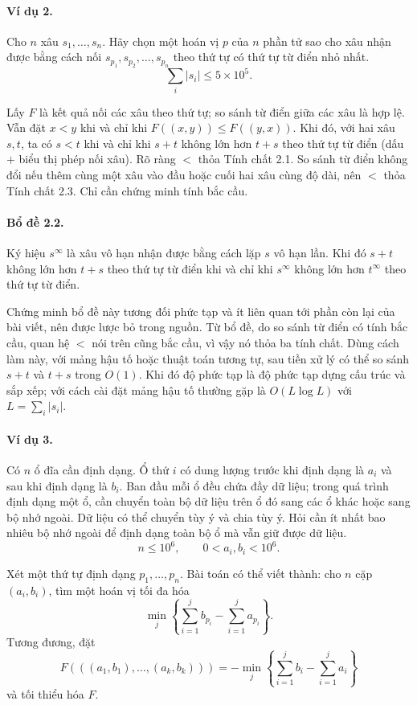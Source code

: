 \documentclass[11pt]{article}
\begin{document}
\paragraph{Ví dụ 2.}
Cho $n$ xâu $s_1,\ldots,s_n$. Hãy chọn một hoán vị $p$ của $n$ phần tử sao cho
xâu nhận được bằng cách nối $s_{p_1},s_{p_2},\ldots,s_{p_n}$ theo thứ tự có thứ
tự từ điển nhỏ nhất.
\[
  \sum_i |s_i|\le 5\times 10^5.
\]

Lấy $F$ là kết quả nối các xâu theo thứ tự; so sánh từ điển giữa các xâu là hợp
lệ. Vẫn đặt $x<y$ khi và chỉ khi $F((x,y))\le F((y,x))$. Khi đó, với hai xâu
$s,t$, ta có $s<t$ khi và chỉ khi $s+t$ không lớn hơn $t+s$ theo thứ tự từ điển
(dấu $+$ biểu thị phép nối xâu). Rõ ràng $<$ thỏa Tính chất 2.1. So sánh từ
điển không đổi nếu thêm cùng một xâu vào đầu hoặc cuối hai xâu cùng độ dài, nên
$<$ thỏa Tính chất 2.3. Chỉ cần chứng minh tính bắc cầu.

\paragraph{Bổ đề 2.2.}
Ký hiệu $s^\infty$ là xâu vô hạn nhận được bằng cách lặp $s$ vô hạn lần. Khi đó
$s+t$ không lớn hơn $t+s$ theo thứ tự từ điển khi và chỉ khi $s^\infty$ không
lớn hơn $t^\infty$ theo thứ tự từ điển.

Chứng minh bổ đề này tương đối phức tạp và ít liên quan tới phần còn lại của
bài viết, nên được lược bỏ trong nguồn. Từ bổ đề, do so sánh từ điển có tính
bắc cầu, quan hệ $<$ nói trên cũng bắc cầu, vì vậy nó thỏa ba tính chất. Dùng
cách làm này, với mảng hậu tố hoặc thuật toán tương tự, sau tiền xử lý có thể
so sánh $s+t$ và $t+s$ trong $O(1)$. Khi đó độ phức tạp là độ phức tạp dựng
cấu trúc và sắp xếp; với cách cài đặt mảng hậu tố thường gặp là
$O(L\log L)$ với $L=\sum_i |s_i|$.

\paragraph{Ví dụ 3.}
Có $n$ ổ đĩa cần định dạng. Ổ thứ $i$ có dung lượng trước khi định dạng là
$a_i$ và sau khi định dạng là $b_i$. Ban đầu mỗi ổ đều chứa đầy dữ liệu; trong
quá trình định dạng một ổ, cần chuyển toàn bộ dữ liệu trên ổ đó sang các ổ khác
hoặc sang bộ nhớ ngoài. Dữ liệu có thể chuyển tùy ý và chia tùy ý. Hỏi cần ít
nhất bao nhiêu bộ nhớ ngoài để định dạng toàn bộ ổ mà vẫn giữ được dữ liệu.
\[
  n\le 10^6,\qquad 0<a_i,b_i<10^6.
\]

Xét một thứ tự định dạng $p_1,\ldots,p_n$. Bài toán có thể viết thành: cho $n$
cặp $(a_i,b_i)$, tìm một hoán vị tối đa hóa
\[
  \min_j\left\{\sum_{i=1}^j b_{p_i}-\sum_{i=1}^j a_{p_i}\right\}.
\]
Tương đương, đặt
\[
  F(((a_1,b_1),\ldots,(a_k,b_k)))
  =
  -\min_j\left\{\sum_{i=1}^j b_i-\sum_{i=1}^j a_i\right\}
\]
và tối thiểu hóa $F$.
\end{document}

